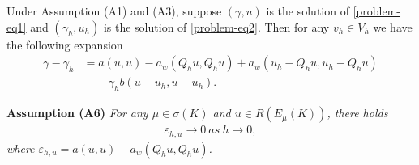 \documentclass[leqno,CJK]{siamltex704}
\numberwithin{equation}{section}
\begin{document}
	\begin{lemma}\label{lemma-expansionQhu}
		Under Assumption (A1) and (A3), suppose $(\gamma,u)$ is the solution of \eqref{problem-eq1} and $(\gamma_h,u_h)$ is the
		solution of \eqref{problem-eq2}. Then for any $v_h\in V_h$ we have the following expansion
		\begin{align*}
			\gamma-\gamma_h &= a(u,u) - a_w(Q_hu,Q_hu) + a_w(u_h-Q_hu,u_h-Q_hu)
			\\
			&\quad-\gamma_h b(u-u_h,u-u_h).
		\end{align*}
	\end{lemma}

	
	
	\textbf{Assumption (A6)}\emph{ For any $\mu\in \sigma(K)$ and $u\in R(E_\mu(K))$, there holds
		\begin{eqnarray*}
			\varepsilon_{h,u}\rightarrow 0\ as \ h\rightarrow 0,
		\end{eqnarray*}
		where $\varepsilon_{h,u} = a(u,u) - a_w(Q_hu,Q_hu)$.}
	
\end{document}
